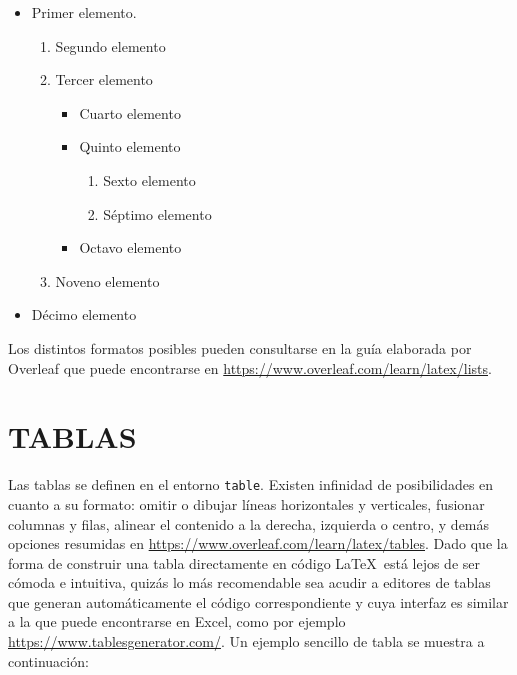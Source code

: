 \begin{itemize}
    \item Primer elemento.
    \begin{enumerate}
        \item Segundo elemento
        \item Tercer elemento
        \begin{itemize}
            \item Cuarto elemento
            \item Quinto elemento
            \begin{enumerate}
                \item Sexto elemento
                \item Séptimo elemento
            \end{enumerate}
            \item Octavo elemento
        \end{itemize}
        \item Noveno elemento
    \end{enumerate}
    \item Décimo elemento
\end{itemize}

Los distintos formatos posibles pueden consultarse en la guía elaborada por Overleaf que puede encontrarse en \url{https://www.overleaf.com/learn/latex/lists}.




\newpage
\section{TABLAS} \label{sec:tablas}

Las tablas se definen en el entorno \texttt{table}. Existen infinidad de posibilidades en cuanto a su formato: omitir o dibujar líneas horizontales y verticales, fusionar columnas y filas, alinear el contenido a la derecha, izquierda o centro, y demás opciones resumidas en \url{https://www.overleaf.com/learn/latex/tables}. Dado que la forma de construir una tabla directamente en código \LaTeX \ está lejos de ser cómoda e intuitiva, quizás lo más recomendable sea acudir a editores de tablas que generan automáticamente el código correspondiente y cuya interfaz es similar a la que puede encontrarse en Excel, como por ejemplo \url{https://www.tablesgenerator.com/}. Un ejemplo sencillo de tabla se muestra a continuación:

